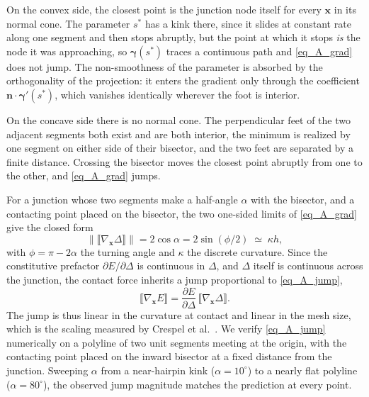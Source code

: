 On the convex side, the closest point is the junction node itself for every $\mathbf{x}$ in its normal cone. The parameter $s^\ast$ has a kink there, since it slides at constant rate along one segment and then stops abruptly, but the point at which it stops \emph{is} the node it was approaching, so $\boldsymbol{\gamma}(s^\ast)$ traces a continuous path and \eqref{eq_A_grad} does not jump. The non-smoothness of the parameter is absorbed by the orthogonality of the projection: it enters the gradient only through the coefficient $\mathbf n \cdot \boldsymbol{\gamma}'(s^\ast)$, which vanishes identically wherever the foot is interior.

On the concave side there is no normal cone. The perpendicular feet of the two adjacent segments both exist and are both interior, the minimum is realized by one segment on either side of their bisector, and the two feet are separated by a finite distance. Crossing the bisector moves the closest point abruptly from one to the other, and \eqref{eq_A_grad} jumps. 

For a junction whose two segments make a half-angle $\alpha$ with the bisector, and a contacting point placed on the bisector, the two one-sided limits of \eqref{eq_A_grad} give the closed form
\begin{equation}
    \bigl\lVert \llbracket \nabla_{\mathbf{x}}\Delta \rrbracket \bigr\rVert
      = 2\cos\alpha = 2\sin(\phi/2) \;\simeq\; \kappa h ,
    \label{eq_A_jump}
\end{equation}
with $\phi = \pi - 2\alpha$ the turning angle and $\kappa$ the discrete curvature. Since the constitutive prefactor $\partial E/\partial\Delta$ is continuous in $\Delta$, and $\Delta$ itself is continuous across the junction, the contact force inherits a jump proportional to \eqref{eq_A_jump},
\begin{equation}
    \llbracket \nabla_{\mathbf{x}} E \rrbracket
      = \frac{\partial E}{\partial \Delta}\,
        \llbracket \nabla_{\mathbf{x}}\Delta \rrbracket .
    \label{eq_A_forcejump}
\end{equation}
The jump is thus linear in the curvature at contact and linear in the mesh size, which is the scaling measured by Crespel et al.\ \cite{crespel_bertails2024_highorder}. We verify \eqref{eq_A_jump} numerically on a polyline of two unit segments meeting at the origin, with the contacting point placed on the inward bisector at a fixed distance from the junction. Sweeping $\alpha$ from a near-hairpin kink ($\alpha = 10^\circ$) to a nearly flat polyline ($\alpha = 80^\circ$), the observed jump magnitude matches the prediction at every point.

